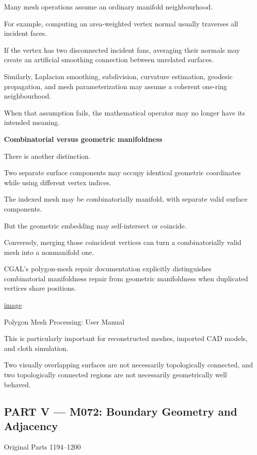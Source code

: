 Many mesh operations assume an ordinary manifold neighbourhood.

For example, computing an area-weighted vertex normal usually traverses all incident faces.

If the vertex has two disconnected incident fans, averaging their normals may create an artificial smoothing connection between unrelated surfaces.

Similarly, Laplacian smoothing, subdivision, curvature estimation, geodesic propagation, and mesh parameterization may assume a coherent one-ring neighbourhood.

When that assumption fails, the mathematical operator may no longer have its intended meaning.

\textbf{Combinatorial versus geometric manifoldness}

There is another distinction.

Two separate surface components may occupy identical geometric coordinates while using different vertex indices.

The indexed mesh may be combinatorially manifold, with separate valid surface components.

But the geometric embedding may self-intersect or coincide.

Conversely, merging those coincident vertices can turn a combinatorially valid mesh into a nonmanifold one.

CGAL's polygon-mesh repair documentation explicitly distinguishes combinatorial manifoldness repair from geometric manifoldness when duplicated vertices share positions. 

\href{https://www.google.com/s2/favicons?domain=https://doc.cgal.org&sz=32}{image}

Polygon Mesh Processing: User Manual

This is particularly important for reconstructed meshes, imported CAD models, and cloth simulation.

Two visually overlapping surfaces are not necessarily topologically connected, and two topologically connected regions are not necessarily geometrically well behaved.

\subsection{PART V --- M072: Boundary Geometry and Adjacency}\label{04-visual-computing-ii-ch023-part-v-m072-boundary-geometry-and-adjacency}

Original Parts 1194--1200

